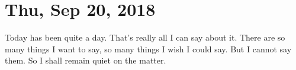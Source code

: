 \section{Thu, Sep 20, 2018}

Today has been quite a day. That's really all I can say about it. There are so many
things I want to say, so many things I wish I could say. But I cannot say them. So I
shall remain quiet on the matter.